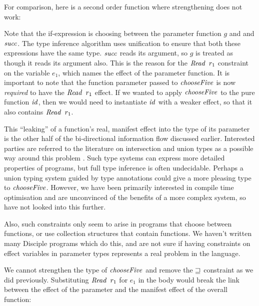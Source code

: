 For comparison, here is a second order function where strengthening does not work:


Note that the if-expression is choosing between the parameter function $g$ and and $\operatorname{\mathit{succ}}$. The type inference algorithm uses unification to ensure that both these expressions have the same type. $\operatorname{\mathit{succ}}$ reads its argument, so $g$ is treated as though it reads its argument also. This is the reason for the $\operatorname{\mathit{Read}} \ r_1$ constraint on the variable $e_1$, which names the effect of the parameter function. It is important to note that the function parameter passed to $\operatorname{\mathit{chooseFive}}$ is now \emph{required} to have the $\operatorname{\mathit{Read}} \ r_1$ effect. If we wanted to apply $\operatorname{\mathit{chooseFive}}$ to the pure function $\operatorname{\mathit{id}}$, then we would need to instantiate $\operatorname{\mathit{id}}$ with a weaker effect, so that it also contains $\operatorname{\mathit{Read}} \ r_1$.

This ``leaking'' of a function's real, manifest effect into the type of its parameter is the other half of the bi-directional information flow discussed earlier. Interested parties are referred to the literature on intersection and union types as a possible way around this problem \cite{cartwright:soft-typing, dunfield:intersections-and-unions}. Such type systems can express more detailed properties of programs, but full type inference is often undecidable. Perhaps a union typing system guided by type annotations could give a more pleasing type to $\operatorname{\mathit{chooseFive}}$. However, we have been primarily interested in compile time optimisation and are unconvinced of the benefits of a more complex system, so have not looked into this further.

Also, such constraints only seem to arise in programs that choose between functions, or use collection structures that contain functions. We haven't written many Disciple programs which do this, and are not sure if having constraints on effect variables in parameter types represents a real problem in the language. 

We cannot strengthen the type of $\operatorname{\mathit{chooseFive}}$ and remove the $\sqsupseteq$ constraint as we did previously. Substituting $\operatorname{\mathit{Read}} \ r_1$ for $e_1$ in the body would break the link between the effect of the parameter and the manifest effect of the overall function:

